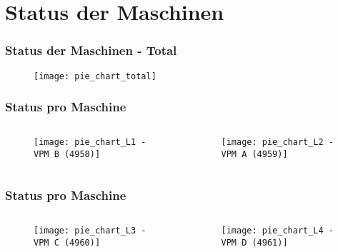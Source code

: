\section{Status der Maschinen}
\begin{frame}
    \frametitle{Status der Maschinen - Total}

    \begin{figure}
        \centering
        \texttt{[image: pie\_chart\_total]}
    \end{figure}

\end{frame}

\begin{frame}
    \frametitle{Status pro Maschine}

    \begin{columns}[t]
        \begin{column}{0.48\linewidth}
            \begin{figure}
                \centering
                \texttt{[image: pie\_chart\_L1 - VPM B (4958)]}
            \end{figure}
        \end{column}
        \begin{column}{0.48\linewidth}
            \begin{figure}
                \centering
                \texttt{[image: pie\_chart\_L2 - VPM A (4959)]}
            \end{figure}
        \end{column}
    \end{columns}

\end{frame}

\begin{frame}
    \frametitle{Status pro Maschine}

    \begin{columns}[t]
        \begin{column}{0.48\linewidth}
            \begin{figure}
                \centering
                \texttt{[image: pie\_chart\_L3 - VPM C (4960)]}
            \end{figure}
        \end{column}
        \begin{column}{0.48\linewidth}
            \begin{figure}
                \centering
                \texttt{[image: pie\_chart\_L4 - VPM D (4961)]}
            \end{figure}
        \end{column}
    \end{columns}

\end{frame}